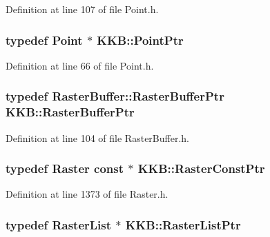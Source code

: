 Definition at line 107 of file Point.\+h.

\subsubsection[{\texorpdfstring{Point\+Ptr}{PointPtr}}]{\setlength{\rightskip}{0pt plus 5cm}typedef {\bf Point} $\ast$ {\bf K\+K\+B\+::\+Point\+Ptr}}\hypertarget{namespace_k_k_b_a7ad8f8714e7458f91202e9e758fdde21}{}\label{namespace_k_k_b_a7ad8f8714e7458f91202e9e758fdde21}


Definition at line 66 of file Point.\+h.

\subsubsection[{\texorpdfstring{Raster\+Buffer\+Ptr}{RasterBufferPtr}}]{\setlength{\rightskip}{0pt plus 5cm}typedef {\bf Raster\+Buffer\+::\+Raster\+Buffer\+Ptr} {\bf K\+K\+B\+::\+Raster\+Buffer\+Ptr}}\hypertarget{namespace_k_k_b_afa8bd43b3a637005b458f44102e99724}{}\label{namespace_k_k_b_afa8bd43b3a637005b458f44102e99724}


Definition at line 104 of file Raster\+Buffer.\+h.

\subsubsection[{\texorpdfstring{Raster\+Const\+Ptr}{RasterConstPtr}}]{\setlength{\rightskip}{0pt plus 5cm}typedef {\bf Raster} const $\ast$ {\bf K\+K\+B\+::\+Raster\+Const\+Ptr}}\hypertarget{namespace_k_k_b_a5acfa7402dc4df1769f90d3dc8ddfc2c}{}\label{namespace_k_k_b_a5acfa7402dc4df1769f90d3dc8ddfc2c}


Definition at line 1373 of file Raster.\+h.

\subsubsection[{\texorpdfstring{Raster\+List\+Ptr}{RasterListPtr}}]{\setlength{\rightskip}{0pt plus 5cm}typedef {\bf Raster\+List} $\ast$ {\bf K\+K\+B\+::\+Raster\+List\+Ptr}}\hypertarget{namespace_k_k_b_a5369c086484e7d77bcb87b0b8aa7193d}{}\label{namespace_k_k_b_a5369c086484e7d77bcb87b0b8aa7193d}


